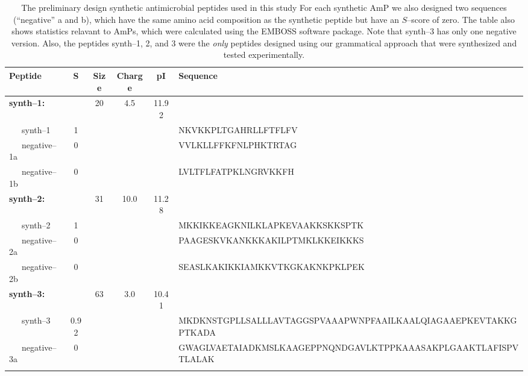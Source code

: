 
\begin{sidewaystable}[ptbh]
    \caption[The preliminary design synthetic antimicrobial peptides used in this study]{The preliminary design synthetic antimicrobial peptides used in this study
	For each synthetic AmP we also designed two sequences
	(``negative'' a and b), which have the same amino acid
	composition as the synthetic peptide but have an $S$--score
	of zero.  The table also shows statistics relavant to
	AmPs, which were calculated using the EMBOSS software
	package\cite{rice2000emboss}.  Note that synth--3 has only
	one negative version.  Also, the peptides synth--1, 2, and 3
	were the \emph{only} peptides designed using our grammatical
	approach that were synthesized and tested experimentally.
        }\label{table:peptides} \begin{center} 
    \begin{tabular}{lccccl} \hline \hline
	Peptide &  S & Size & Charge & pI & Sequence\\ \hline
	\textbf{synth--1:} &  & 20 & 4.5 & 11.92\\
	~~~synth--1 & 1 &  &  &  & {\footnotesize \ttfamily NKVKKPLTGAHRLLFTFLFV} \\
	~~~negative--1a & 0 &  &  &  & {\footnotesize \ttfamily VVLKLLFFKFNLPHKTRTAG} \\
	~~~negative--1b & 0 &  &  &  & {\footnotesize \ttfamily LVLTFLFATPKLNGRVKKFH} \\
	\textbf{synth--2:} &  & 31 & 10.0 & 11.28 \\
	~~~synth--2  & 1 &  &  &   & {\footnotesize \ttfamily MKKIKKEAGKNILKLAPKEVAAKKSKKSPTK} \\
	~~~negative--2a  & 0 &  &  &   & {\footnotesize \ttfamily PAAGESKVKANKKKAKILPTMKLKKEIKKKS} \\
	~~~negative--2b  & 0 &  &  & 	& {\footnotesize \ttfamily SEASLKAKIKKIAMKKVTKGKAKNKPKLPEK} \\
	\textbf{synth--3:}&  & 63 & 3.0 & 10.41\\
	~~~synth--3 & 0.92 &  &  &   & {\footnotesize \ttfamily MKDKNSTGPLLSALLLAVTAGGSPVAAAPWNPFAAILKAALQIAGAAEPKEVTAKKGPTKADA}\\
	~~~negative--3a & 0 &  &  &  & {\footnotesize \ttfamily GWAGLVAETAIADKMSLKAAGEPPNQNDGAVLKTPPKAAASAKPLGAAKTLAFISPVTLALAK}\\
	\\ \hline\hline
    \end{tabular} \end{center}

 \end{sidewaystable}
